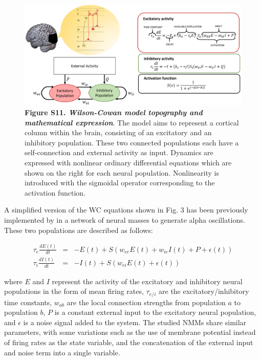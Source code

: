 \documentclass[12pt,twoside]{article}
\begin{document}
\begin{figure}[h]
    \centering
    \includegraphics[scale=0.48]{Images/Fig3__WC.png}
    \caption*{\textbf{Figure S11.  \textit{Wilson-Cowan model topography and mathematical expression}}. The model aims to represent a cortical column within the brain, consisting of an excitatory and an inhibitory population. These two connected populations each have a self-connection and external activity as input. Dynamics are expressed with nonlinear ordinary differential equations which are shown on the right for each neural population. Nonlinearity is introduced with the sigmoidal operator corresponding to the activation function.}
    \label{fig:WC_topography}
\end{figure}


A simplified version of the WC equations shown in Fig. 3 has been previously implemented by \citet{abeysuriya2018biophysical} in a network of neural masses to generate alpha oscillations. These two populations are described as follows:

\begin{eqnarray}
    \tau_{e}\frac{dE(t)}{dt} &=& -E(t) + S(w_{ee}E(t) + w_{ie}I(t) + P + \epsilon(t)) \\
    \tau_{i}\frac{dI(t)}{dt} &=& -I(t) + S(w_{ei}E(t) + \epsilon(t))
\end{eqnarray}

where $E$ and $I$ represent the activity of the excitatory and inhibitory neural populations in the form of mean firing rates, $\tau_{e/i}$ are the excitatory/inhibitory time constants, $w_{ab}$ are the local connection strengths from population $a$ to population $b$, $P$ is a constant external input to the excitatory neural population, and $\epsilon$ is a noise signal added to the system. The studied NMMs share similar parameters, with some variations such as the use of membrane potential instead of firing rates as the state variable, and the concatenation of the external input and noise term into a single variable.
\end{document}
